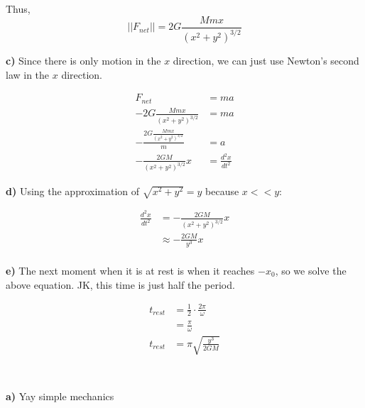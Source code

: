 \documentclass{article}
\begin{document}
Thus,
$$
||F_{net}|| = 2G\frac{Mm x}{(x^2+y^2)^{3/2}}
$$

\vspace{1cm}
\large\textbf{c)} Since there is only motion in the $x$ direction, we can just use Newton's second law in the $x$ direction.

\begin{align*}
    F_{net} &= ma \\
    -2G\frac{Mm x}{(x^2+y^2)^{3/2}} &= ma \\
    -\frac{2G\frac{Mm x}{(x^2+y^2)^{3/2}}}{m} &= a\\
    -\frac{2GM}{(x^2+y^2)^{3/2}}x &= \frac{d^2x}{dt^2}
\end{align*}

\vspace{1cm}
\large\textbf{d)} Using the approximation of $\sqrt{x^2+y^2}=y$ because $x<<y$:

\begin{align*}
    \frac{d^2 x}{dt^2} &= -\frac{2GM}{({x^2+y^2})^{3/2}}x \\
    &\approx -\frac{2GM}{y^3}x \\
\end{align*}

\vspace{1cm}
\large\textbf{e)} The next moment when it is at rest is when it reaches $-x_0$, so we solve the above equation. JK, this time is just half the period.

\begin{align*}
    t_{rest} &= \frac{1}{2}\cdot\frac{2\pi}{\omega} \\
    &= \frac{\pi}{\omega} \\
    t_{rest} &= \pi\sqrt{\frac{y^3}{2GM}} \\
\end{align*}

\newpage
\section{}

\vspace{1cm}
\large\textbf{a)} Yay simple mechanics
\end{document}
